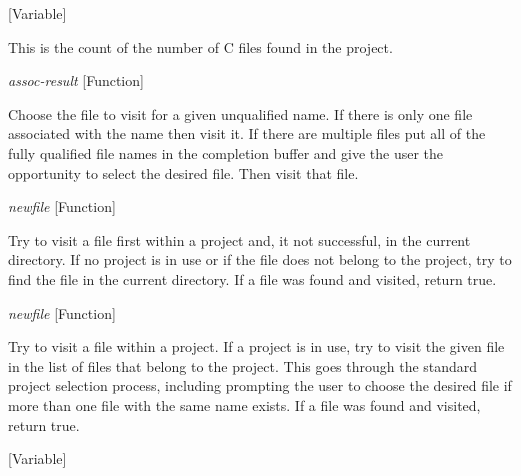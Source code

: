 \vspace{1em}
\noindent
{}
\usebox{\funcname}
 \hfill [Variable]

\begin{doc-string}
This is the count of the number of C files found in the project.
\end{doc-string}

\vspace{1em}
\noindent
{}
\usebox{\funcname}\emph{assoc-result}
 \hfill [Function]

\begin{doc-string}
Choose the file to visit for a given unqualified name.  If there is
only one file associated with the name then visit it.  If there are
multiple files put all of the fully qualified file names in the completion
buffer and give the user the opportunity to select the desired file.  Then
visit that file.
\end{doc-string}

\vspace{1em}
\noindent
{}
\usebox{\funcname}\emph{newfile}
 \hfill [Function]

\begin{doc-string}
Try to visit a file first within a project and, it not successful, in the
current directory.  If no project is in use or if the file does not belong to
the project, try to find the file in the current directory.  If a file was found
and visited, return true.
\end{doc-string}

\vspace{1em}
\noindent
{}
\usebox{\funcname}\emph{newfile}
 \hfill [Function]

\begin{doc-string}
Try to visit a file within a project.  If a project is in use, try to visit
the given file in the list of files that belong to the project.  This goes
through the standard project selection process, including prompting the user to
choose the desired file if more than one file with the same name exists.  If a
file was found and visited, return true.
\end{doc-string}

\vspace{1em}
\noindent
{}
\usebox{\funcname}
 \hfill [Variable]

